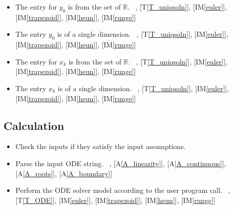 \documentclass[12pt]{article}
\newcommand{\tref}[1]{T\ref{#1}}
\newcounter{assumpnum} %
\newcommand{\aref}[1]{A\ref{#1}}
\newcommand{\iref}[1]{IM\ref{#1}}
\newcounter{lcnum} %
\newcounter{calcnum} %
\begin{document}
\begin{itemize}
\item[A\refstepcounter{assumpnum}\theassumpnum \label{A_entriesofy0}:]
The entry for $y_0$ is from the set of $\mathbb{R}$.
~\newline
[\tref{T_ODE}], [\tref{T_uniqsoln}],
[\iref{euler}], [\iref{trapezoid}], [\iref{heun}], [\iref{runge}]

\item[A\refstepcounter{assumpnum}\theassumpnum \label{A_dimofy0}:]
The entry $y_0$ is of a single dimension.
~\newline
[\tref{T_ODE}], [\tref{T_uniqsoln}],
[\iref{euler}], [\iref{trapezoid}], [\iref{heun}], [\iref{runge}]

\item[A\refstepcounter{assumpnum}\theassumpnum \label{A_entriesofxk}:]
The entry for $x_k$ is from the set of $\mathbb{R}$.
~\newline
[\tref{T_ODE}], [\tref{T_uniqsoln}],
[\iref{euler}], [\iref{trapezoid}], [\iref{heun}], [\iref{runge}]

\item[A\refstepcounter{assumpnum}\theassumpnum \label{A_dimofxk}:]
The entry $x_k$ is of a single dimension.
~\newline
[\tref{T_ODE}], [\tref{T_uniqsoln}],
[\iref{euler}], [\iref{trapezoid}], [\iref{heun}], [\iref{runge}]

\end{itemize}

\subsection{Calculation} \label{sec_Calculation}

\begin{itemize}
\item[C\refstepcounter{calcnum}\thecalcnum \label{C_inputs}:]
Check the inputs if they satisfy the input assumptions.
~


\item[C\refstepcounter{calcnum}\thecalcnum \label{C_odeparse}:]
Parse the input ODE string.
~\newline
[\aref{A_explicit}], [\aref{A_linearity}], [\aref{A_continuous}], [\aref{A_roots}],
[\aref{A_boundary}]

\item[C\refstepcounter{calcnum}\thecalcnum \label{C_progname}:]
Perform the ODE solver model according to the user program call.
~\newline
[\aref{A_typeoff}], [\tref{T_ODE}], [\iref{euler}], [\iref{trapezoid}],
[\iref{heun}], [\iref{runge}]


\end{itemize}
\end{document}

